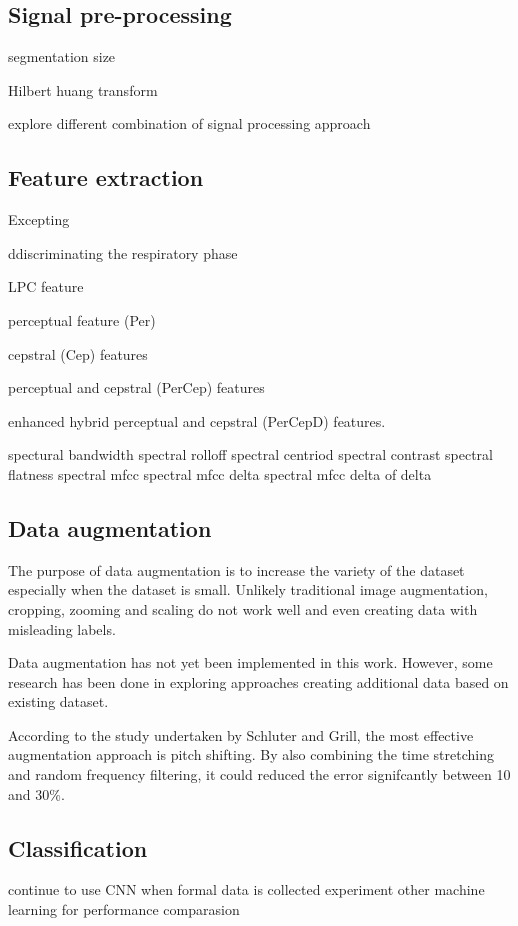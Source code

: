 \subsection{Signal pre-processing}
segmentation size


Hilbert huang transform

explore different combination of signal processing approach

\subsection{Feature extraction}
Excepting  

ddiscriminating the respiratory phase 

LPC feature

perceptual feature (Per)

cepstral (Cep) features

perceptual and cepstral (PerCep) features 

enhanced hybrid perceptual and cepstral (PerCepD) features.

spectural bandwidth
spectral rolloff
spectral centriod
spectral contrast
spectral flatness
spectral mfcc
spectral mfcc delta
spectral mfcc delta of delta

\subsection{Data augmentation}
The purpose of data augmentation is to increase the variety of the dataset especially when the dataset is small. Unlikely traditional image augmentation, cropping, zooming and scaling do not work well and even creating data with misleading labels. 

Data augmentation has not yet been implemented in this work. However, some research has been done in exploring approaches creating additional data based on existing dataset.\cite{Cho2017DeepBreathSettings} \cite{Schluter2015ExploringNetworks}

According to the study undertaken by Schluter and Grill, the most effective augmentation approach is pitch shifting. By also combining the time stretching and random frequency filtering, it could reduced the error signifcantly between 10 and 30\%.\cite{Schluter2015ExploringNetworks}

\subsection{Classification}
continue to use CNN when formal data is collected
experiment other machine learning for performance comparasion

